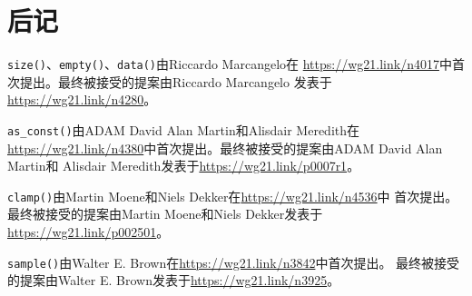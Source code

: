 \section{后记}
\texttt{size()}、\texttt{empty()}、\texttt{data()}由Riccardo Marcangelo在
\url{https://wg21.link/n4017}中首次提出。最终被接受的提案由Riccardo Marcangelo
发表于\url{https://wg21.link/n4280}。

\texttt{as\_const()}由ADAM David Alan Martin和Alisdair Meredith在
\url{https://wg21.link/n4380}中首次提出。最终被接受的提案由ADAM David Alan Martin和
Alisdair Meredith发表于\url{https://wg21.link/p0007r1}。

\texttt{clamp()}由Martin Moene和Niels Dekker在\url{https://wg21.link/n4536}中
首次提出。最终被接受的提案由Martin Moene和Niels Dekker发表于\url{https://wg21.link/p002501}。

\texttt{sample()}由Walter E. Brown在\url{https://wg21.link/n3842}中首次提出。
最终被接受的提案由Walter E. Brown发表于\url{https://wg21.link/n3925}。